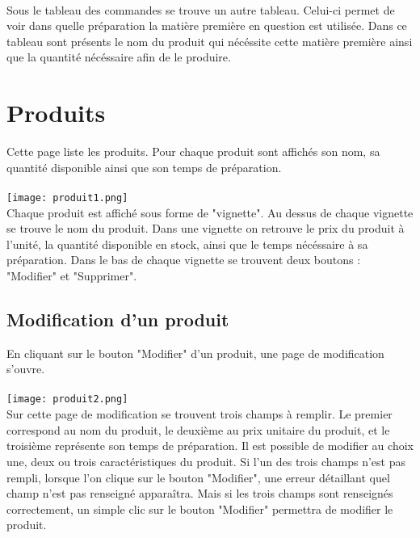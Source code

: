 \paragraph{}
Sous le tableau des commandes se trouve un autre tableau. Celui-ci permet de
voir dans quelle préparation la matière première en question est utilisée. Dans
ce tableau sont présents le nom du produit qui nécéssite cette matière première
ainsi que la quantité nécéssaire afin de le produire.



\section{Produits}
Cette page liste les produits. Pour chaque produit sont affichés son nom, sa
quantité disponible ainsi que son temps de préparation.

\paragraph{}
\texttt{[image: produit1.png]}\\
Chaque produit est affiché sous forme de "vignette". Au dessus de chaque
vignette se trouve le nom du produit. Dans une vignette on retrouve le prix du
produit à l'unité, la quantité disponible en stock, ainsi que le temps nécéssaire
à sa préparation. Dans le bas de chaque vignette se trouvent deux boutons :
"Modifier" et "Supprimer".

\subsection{Modification d'un produit}
En cliquant sur le bouton "Modifier" d'un produit, une page de modification
s'ouvre.

\paragraph{}
\texttt{[image: produit2.png]}\\
Sur cette page de modification se trouvent trois champs à remplir.
Le premier correspond au nom du produit, le deuxième au prix unitaire du produit,
et le troisième représente son temps de préparation. Il est possible de modifier
au choix une, deux ou trois caractéristiques du produit. Si l'un des trois champs
n'est pas rempli, lorsque l'on clique sur le bouton "Modifier", une erreur
détaillant quel champ n'est pas renseigné apparaîtra. Mais si les trois champs
sont renseignés correctement, un simple clic sur le bouton "Modifier" permettra
de modifier le produit.


